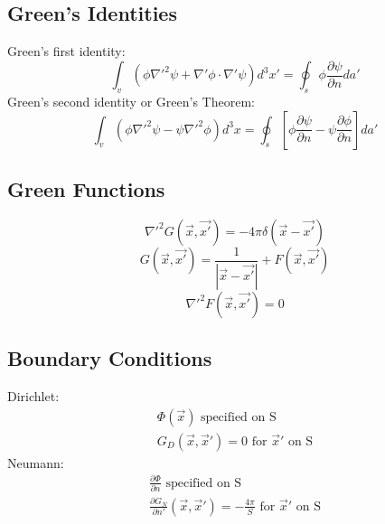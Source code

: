 \subsection{Green's Identities}
Green's first identity:
\begin{equation}
	\int_v \left( \phi \nabla'^2\psi + \nabla' \phi \cdot \nabla' \psi \right)d^3x' = \oint_s \phi \frac{\partial \psi}{\partial n} da'
\end{equation}
Green's second identity or Green's Theorem:
\begin{equation}
	\int_{v} \left(\phi \nabla'^2\psi - \psi \nabla'^2\phi \right)d^3x 
	= \oint_s \left[ \phi \frac{\partial \psi}{\partial n} - \psi \frac{\partial \phi}{\partial n} \right]da'  
\end{equation}

\subsection{Green Functions}
\begin{equation}
	\nabla'^2G(\vec{x}, \vec{x'}) = -4\pi \delta(\vec{x} - \vec{x'})
\end{equation}
\begin{equation}
	G(\vec{x}, \vec{x'}) = \frac{1}{|\vec{x} - \vec{x'}|} + F(\vec{x}, \vec{x'})
\end{equation}
\begin{equation}
	\nabla'^2 F(\vec{x}, \vec{x'}) = 0
\end{equation}


\subsection{Boundary Conditions}
Dirichlet:
\begin{equation}
	\begin{split}
		\Phi(\vec x)  \text{   specified on S} \\
		G_D(\vec x, \vec x') = 0 \text{   for $\vec x'$ on S}
	\end{split}
\end{equation}
Neumann:
\begin{equation}
	\begin{split}
		\frac{\partial \Phi}{\partial n} \text{   specified on S} \\
		\frac{\partial G_N}{\partial n'}(\vec x, \vec x') = -\frac{4 \pi}{S} \text{   for $\vec x'$ on S}
	\end{split}
\end{equation}